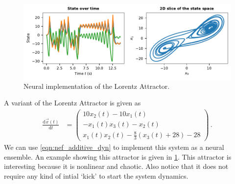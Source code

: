 \documentclass[10pt,letterpaper,oneside]{article}
\begin{document}
\begin{figure}[t]
	\centering
	\includegraphics{media/example_lorentz.pdf}
	\caption{Neural implementation of the Lorentz Attractor. }
	\label{fig:example_lorentz}
\end{figure}

A variant of the Lorentz Attractor is given as
\begin{align*}
	\frac{\mathrm{d}\vec x(t)}{\mathrm{d}t} &= \begin{pmatrix}
		10 x_2(t)-10x_1(t) \\
		-x_1(t) x_3(t)-x_2(t) \\
		 x_1(t) x_2(t) - \frac{8}{3}(x_3(t)+28)-28
	\end{pmatrix} \,.
\end{align*}
We can use \cref{eqn:nef_additive_dyn} to implement this system as a neural ensemble. An example showing this attractor is given in \cref{fig:example_lorentz}. This attractor is interesting because it is nonlinear and chaotic. Also notice that it does not require any kind of intial `kick' to start the system dynamics. 

%
%
%
%
\end{document}
